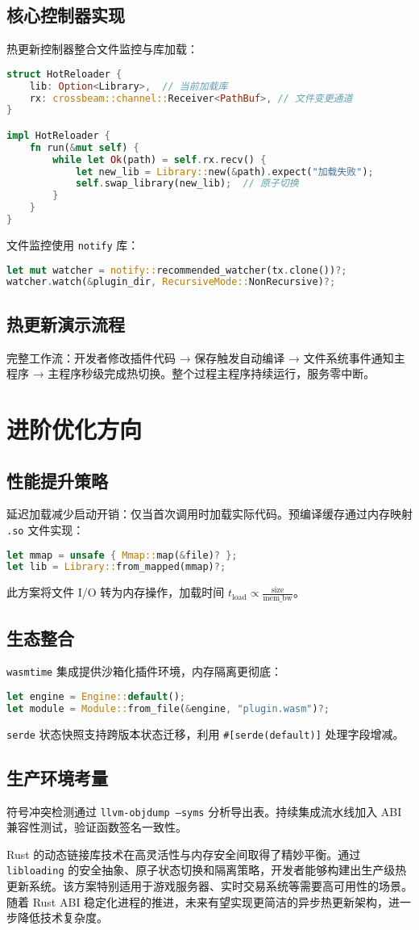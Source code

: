 \section{核心控制器实现}
热更新控制器整合文件监控与库加载：\par
\begin{lstlisting}[language=rust]
struct HotReloader {
    lib: Option<Library>,  // 当前加载库
    rx: crossbeam::channel::Receiver<PathBuf>, // 文件变更通道
}

impl HotReloader {
    fn run(&mut self) {
        while let Ok(path) = self.rx.recv() {
            let new_lib = Library::new(&path).expect("加载失败");
            self.swap_library(new_lib);  // 原子切换
        }
    }
}
\end{lstlisting}
文件监控使用 \texttt{notify} 库：\par
\begin{lstlisting}[language=rust]
let mut watcher = notify::recommended_watcher(tx.clone())?;
watcher.watch(&plugin_dir, RecursiveMode::NonRecursive)?;
\end{lstlisting}
\section{热更新演示流程}
完整工作流：开发者修改插件代码 → 保存触发自动编译 → 文件系统事件通知主程序 → 主程序秒级完成热切换。整个过程主程序持续运行，服务零中断。\par
\chapter{进阶优化方向}
\section{性能提升策略}
延迟加载减少启动开销：仅当首次调用时加载实际代码。预编译缓存通过内存映射 \texttt{.so} 文件实现：\par
\begin{lstlisting}[language=rust]
let mmap = unsafe { Mmap::map(&file)? };
let lib = Library::from_mapped(mmap)?;
\end{lstlisting}
此方案将文件 I/O 转为内存操作，加载时间 $t_{\text{load}} \propto \frac{\text{size}}{\text{mem\_bw}}$。\par
\section{生态整合}
\texttt{wasmtime} 集成提供沙箱化插件环境，内存隔离更彻底：\par
\begin{lstlisting}[language=rust]
let engine = Engine::default();
let module = Module::from_file(&engine, "plugin.wasm")?;
\end{lstlisting}
\texttt{serde} 状态快照支持跨版本状态迁移，利用 \texttt{\#{}[serde(default)]} 处理字段增减。\par
\section{生产环境考量}
符号冲突检测通过 \texttt{llvm-objdump --syms} 分析导出表。持续集成流水线加入 ABI 兼容性测试，验证函数签名一致性。\par
Rust 的动态链接库技术在高灵活性与内存安全间取得了精妙平衡。通过 \texttt{libloading} 的安全抽象、原子状态切换和隔离策略，开发者能够构建出生产级热更新系统。该方案特别适用于游戏服务器、实时交易系统等需要高可用性的场景。随着 Rust ABI 稳定化进程的推进，未来有望实现更简洁的异步热更新架构，进一步降低技术复杂度。\par
